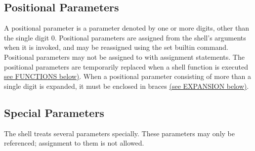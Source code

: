 \subsection{Positional Parameters}\label{sec:positionalparameters}

A positional parameter is a parameter denoted by one or more digits, other than the single digit 0. Positional parameters are assigned from the shell's arguments when it is invoked, and may be reassigned using the set builtin command. Positional parameters may not be assigned to with assignment statements. The positional parameters are temporarily replaced when a shell function is executed \hyperref[sec:functions]{see FUNCTIONS below)}.
When a positional parameter consisting of more than a single digit is expanded, it must be enclosed in braces \hyperref[sec:expansion]{(see EXPANSION below)}.

\subsection{Special Parameters}\label{sec:specialparameters}

The shell treats several parameters specially. These parameters may only be referenced; assignment to them is not allowed.

